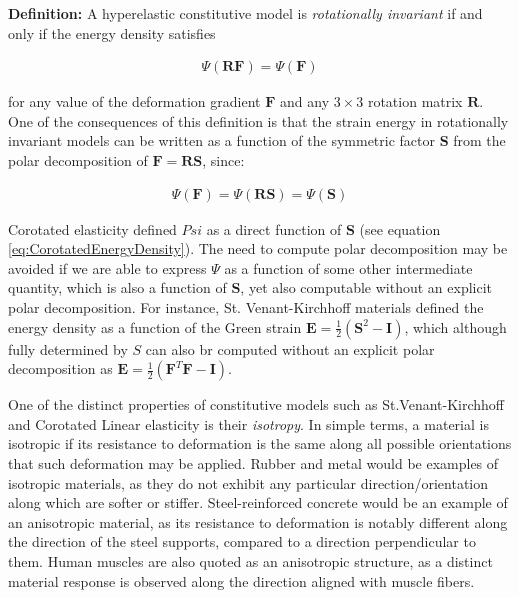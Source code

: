 \textbf{Definition:} A hyperelastic constitutive model is \textit{rotationally invariant} if and only if the energy density satisfies

\begin{gather*}
  \Psi(\boldsymbol{RF})=\Psi(\boldsymbol{F})
\end{gather*}

for any value of the deformation gradient $\boldsymbol{F}$ and any $3 \times 3 $ rotation matrix $\boldsymbol{R}$.
One of the consequences of this definition is that the strain energy in rotationally invariant models can be written
as a function of the symmetric factor $\boldsymbol{S}$ from the polar decomposition of $\boldsymbol{F} = \boldsymbol{RS}$, since:

\begin{gather*}
  \Psi(\boldsymbol{F}) = \Psi(\boldsymbol{RS}) = \Psi(\boldsymbol{S})
\end{gather*}

Corotated elasticity defined $Psi$ as a direct function of $\boldsymbol{S}$ (see equation \ref{eq:CorotatedEnergyDensity}). 
The need to compute polar decomposition may be avoided if we are able to express $\Psi$ as a function of some other intermediate
quantity, which is also a function of $\boldsymbol{S}$, yet also computable without an explicit polar decomposition. For instance, 
St. Venant-Kirchhoff materials defined the energy density as a function of the Green strain 
$\boldsymbol{E} = \frac{1}{2}(\boldsymbol{S}^2 - \boldsymbol{I})$, which although fully determined by $S$ can also br computed without 
an explicit polar decomposition as $\boldsymbol{E} = \frac{1}{2}(\boldsymbol{F}^T\boldsymbol{F} - \boldsymbol{I})$.

One of the distinct properties of constitutive models such as St.Venant-Kirchhoff and Corotated Linear elasticity is their \textit{isotropy}.
In simple terms, a material is isotropic if its resistance to deformation is the same along all possible orientations that such deformation 
may be applied. Rubber and metal would be examples of isotropic materials, as they do not exhibit any particular direction/orientation along
which are softer or stiffer. Steel-reinforced concrete would be an example of an anisotropic material, as its resistance to deformation is 
notably different along the direction of the steel supports, compared to a direction perpendicular to them. Human muscles are also quoted 
as an anisotropic structure, as a distinct material response is observed along the direction aligned with muscle fibers.

